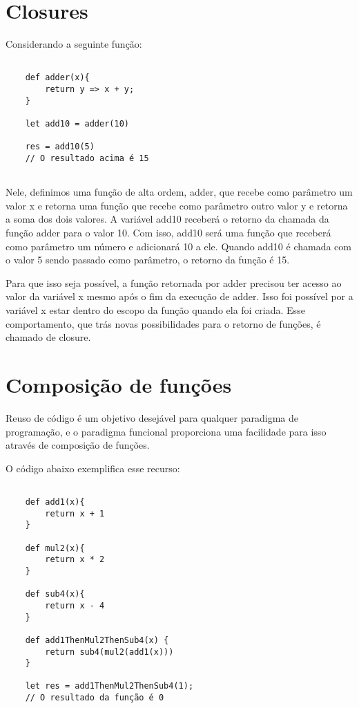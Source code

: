 \section{Closures}

Considerando a seguinte função:

\begin{lstlisting}[caption={Exemplo de Closure},label=closureex]

    def adder(x){
        return y => x + y;
    }

    let add10 = adder(10)

    res = add10(5)
    // O resultado acima é 15


\end{lstlisting}

Nele, definimos uma função de alta ordem, adder, que 
recebe como parâmetro um valor x e retorna uma função 
que recebe como parâmetro outro valor y e retorna a 
soma dos dois valores. A variável add10 receberá 
o retorno da chamada da função adder para o valor 10. 
Com isso, add10 será uma função que receberá como 
parâmetro um número e adicionará 10 a ele. Quando 
add10 é chamada com o valor 5 sendo passado como 
parâmetro, o retorno da função é 15.

Para que isso seja possível, a função retornada por 
adder precisou ter acesso ao valor da variável x mesmo 
após o fim da execução de adder. Isso foi possível 
por a variável x estar dentro do escopo da função 
quando ela foi criada. Esse comportamento, que trás 
novas possibilidades para o retorno de funções, 
é chamado de closure\cite{mflambdas}.



\section{Composição de funções}

Reuso de código é um objetivo desejável para qualquer 
paradigma de programação, e o paradigma funcional 
proporciona uma facilidade para isso através de 
composição de funções\cite{realworldhaskell}.

O código abaixo exemplifica esse recurso:

\begin{lstlisting}[caption={Exemplo de Composição de Funções},label=fogex]

    def add1(x){
        return x + 1
    }

    def mul2(x){
        return x * 2
    }

    def sub4(x){
        return x - 4
    }

    def add1ThenMul2ThenSub4(x) {
        return sub4(mul2(add1(x)))
    }

    let res = add1ThenMul2ThenSub4(1);
    // O resultado da função é 0

\end{lstlisting}

